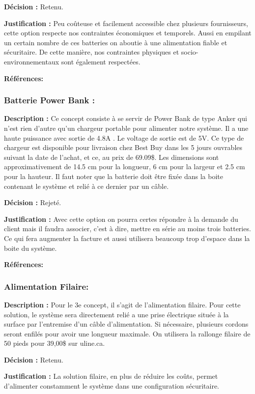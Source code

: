  \textbf{Décision :}
 Retenu.
 
 \textbf{Justification :}
 Peu coûteuse et facilement accessible chez plusieurs fournisseurs, cette option respecte nos contraintes économiques et temporels. Aussi en empilant un certain nombre de ces batteries on aboutie à une alimentation fiable et sécuritaire. De cette manière, nos contraintes physiques et socio-environnementaux sont également respectées.
 
\textbf{Références:} \cite{Lithium}

\subsubsection{Batterie Power Bank :}
\textbf{Description :}
 Ce concept consiste à se servir de Power Bank de type Anker qui n'est rien d'autre qu'un chargeur portable pour alimenter notre système. Il a une haute puissance avec sortie de 4.8A . Le voltage de sortie est de 5V. Ce type de chargeur est disponible pour livraison chez Best Buy dans les 5 jours ouvrables suivant la date de l'achat, et ce, au prix de 69.09\$. Les dimensions sont approximativement de 14.5 cm pour la longueur, 6 cm pour la largeur et 2.5 cm pour la hauteur. Il faut noter que la batterie doit être fixée dans la boite contenant le système et relié à ce dernier par un câble.
 
\textbf{Décision :}
 Rejeté.
 
\textbf{Justification :}
Avec cette option on pourra certes répondre à la demande du client mais il faudra associer, c'est à dire, mettre en série au moins trois batteries. Ce qui fera augmenter la facture et aussi utilisera beaucoup trop d'espace  dans la boite du système.
 
\textbf{Références:} \cite{Power_Bank}
 
\subsubsection{Alimentation Filaire:}
\textbf{Description :}
Pour le 3e concept, il s'agit de l'alimentation filaire. Pour cette solution, le système sera directement relié a une prise électrique située à la surface par l'entremise d'un câble d'alimentation. Si nécessaire, plusieurs cordons seront enfilés pour avoir une longueur maximale. On utilisera la rallonge filaire de 50 pieds pour 39,00\$ sur uline.ca.
 
 \textbf{Décision :}
 Retenu.
 
 \textbf{Justification :}
 La solution filaire, en plus de réduire les coûts, permet d'alimenter constamment le système dans une configuration sécuritaire.
 
